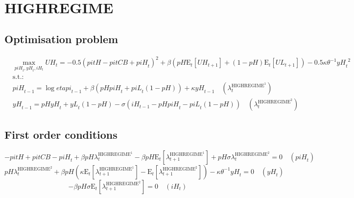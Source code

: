 

\section{HIGHREGIME}

\subsection{Optimisation problem}

\begin{align}
&\max_{{p\!i\!H}_{t}, {y\!H}_{t}, {i\!H}_{t}
} {U\!H}_{t} = -0.5\left({p\!i\!t\!H} - {p\!i\!t\!C\!B} + {p\!i\!H}_{t}\right)^{2} + {\beta} \left({{p\!H}} {\mathrm{E}_{t}\left[{U\!H}_{t+1}\right]} + \left(1 - {p\!H}\right) {\mathrm{E}_{t}\left[{U\!L}_{t+1}\right]}\right) - 0.5{\kappa} {\theta}^{-1} {{y\!H}_{t}}^{2}\\
&\mathrm{s.t.:}\nonumber\\
& {p\!i\!H}_{t-1} = \log{{e\!t\!a\!p\!i}_{t-1}} + {\beta} \left({{p\!H}} {{p\!i\!H}_{t}} + {{p\!i\!L}_{t}} \left(1 - {p\!H}\right)\right) + {\kappa} {{y\!H}_{t-1}} \quad \left(\lambda^{\mathrm{HIGHREGIME}^{\mathrm{1}}}_{t}\right)\\
& {y\!H}_{t-1} = {{p\!H}} {{y\!H}_{t}} + {{y\!L}_{t}} \left(1 - {p\!H}\right) - {\sigma} \left({i\!H}_{t-1} - {{p\!H}} {{p\!i\!H}_{t}} - {{p\!i\!L}_{t}} \left(1 - {p\!H}\right)\right) \quad \left(\lambda^{\mathrm{HIGHREGIME}^{\mathrm{2}}}_{t}\right)
\end{align}


\subsection{First order conditions}

\begin{equation}
-{p\!i\!t\!H} + {p\!i\!t\!C\!B} - {p\!i\!H}_{t} + {\beta} {{p\!H}} {\lambda^{\mathrm{HIGHREGIME}^{\mathrm{1}}}_{t}} - {\beta} {{p\!H}} {\mathrm{E}_{t}\left[\lambda^{\mathrm{HIGHREGIME}^{\mathrm{1}}}_{t+1}\right]} + {{p\!H}} {\sigma} {\lambda^{\mathrm{HIGHREGIME}^{\mathrm{2}}}_{t}} = 0
 \quad \left({p\!i\!H}_{t}\right)
\end{equation}
\begin{equation}
{{p\!H}} {\lambda^{\mathrm{HIGHREGIME}^{\mathrm{2}}}_{t}} + {\beta} {{p\!H}} \left({\kappa} {\mathrm{E}_{t}\left[\lambda^{\mathrm{HIGHREGIME}^{\mathrm{1}}}_{t+1}\right]} - \mathrm{E}_{t}\left[\lambda^{\mathrm{HIGHREGIME}^{\mathrm{2}}}_{t+1}\right]\right) - {\kappa} {\theta}^{-1} {{y\!H}_{t}} = 0
 \quad \left({y\!H}_{t}\right)
\end{equation}
\begin{equation}
-{\beta} {{p\!H}} {\sigma} {\mathrm{E}_{t}\left[\lambda^{\mathrm{HIGHREGIME}^{\mathrm{2}}}_{t+1}\right]} = 0
 \quad \left({i\!H}_{t}\right)
\end{equation}




